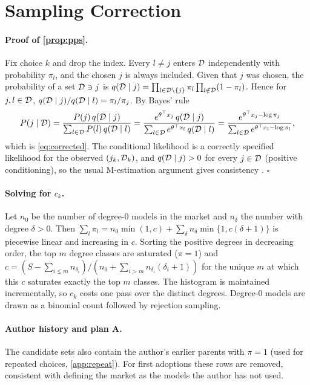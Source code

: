 \section{Sampling Correction}
\label{app:sampling}

\paragraph{Proof of \cref{prop:pps}.}
Fix choice $k$ and drop the index. Every $l \neq j$ enters $\mathcal{D}$ independently with probability $\pi_l$, and the
chosen $j$ is always included. Given that $j$ was chosen, the probability of a set $\mathcal{D} \ni j$ is
$q(\mathcal{D} \mid j) = \prod_{l \in \mathcal{D} \setminus \{j\}} \pi_l \prod_{l \notin \mathcal{D}} (1 - \pi_l)$. Hence for $j, l \in \mathcal{D}$,
$q(\mathcal{D} \mid j) / q(\mathcal{D} \mid l) = \pi_l / \pi_j$. By Bayes' rule
\begin{equation*}
P(j \mid \mathcal{D}) = \frac{P(j)\, q(\mathcal{D} \mid j)}{\sum_{l \in \mathcal{D}} P(l)\, q(\mathcal{D} \mid l)}
= \frac{e^{\theta^\top x_j}\, q(\mathcal{D} \mid j)}{\sum_{l \in \mathcal{D}} e^{\theta^\top x_l}\, q(\mathcal{D} \mid l)}
= \frac{e^{\theta^\top x_j - \log \pi_j}}{\sum_{l \in \mathcal{D}} e^{\theta^\top x_l - \log \pi_l}},
\end{equation*}
which is \eqref{eq:corrected}. The conditional likelihood is a correctly specified likelihood for the observed
$(j_k, \mathcal{D}_k)$, and $q(\mathcal{D} \mid j) > 0$ for every $j \in \mathcal{D}$ (positive conditioning), so the usual M-estimation
argument gives consistency \citep{mcfadden1978modelling,train2009discrete}. \hfill$\square$

\paragraph{Solving for $c_k$.}
Let $n_0$ be the number of degree-0 models in the market and $n_\delta$ the number with degree $\delta > 0$. Then
$\sum_l \pi_l = n_0 \min(1,c) + \sum_\delta n_\delta \min\{1, c(\delta + 1)\}$ is piecewise linear and increasing in
$c$. Sorting the positive degrees in decreasing order, the top $m$ degree classes are saturated ($\pi=1$) and
$c = (S - \sum_{i \le m} n_{\delta_i}) / (n_0 + \sum_{i > m} n_{\delta_i} (\delta_i + 1))$ for the unique $m$ at which
this $c$ saturates exactly the top $m$ classes. The histogram is maintained incrementally, so $c_k$ costs one pass
over the distinct degrees. Degree-0 models are drawn as a binomial count followed by rejection sampling.

\paragraph{Author history and plan A.}
The candidate sets also contain the author's earlier parents with $\pi = 1$ (used for repeated choices,
\cref{app:repeat}). For first adoptions these rows are removed, consistent with defining the market as the models the
author has not used.

